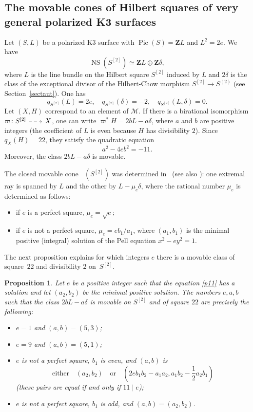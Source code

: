 \documentclass[11pt]{article}
\makeatletter
\newcommand{\Subsection}{\subsection}
\let\mathcal\mathscr
\newcommand{\dradpl}{{\!\!\xymatrix@C=8mm{\ar@{-->}[r]&}\!\!}}
\newcommand{\dratst}{{\,\mathrel{\scalebox{.8}{$\dradpl$}}\,}}
\newcommand{\drascst}{{\,\mathrel{\scalebox{.6}{$\dradpl$}}\,}}
\newcommand{\dra}{\mathchoice{\dradpl}{\dratst}{\drascst}{\drascst}}
\newtheorem{prop}[lemm]{Proposition}
\theoremstyle{definition}
\newcommand\Z{{\mathbf Z}}
\newcommand\cM{\mathcal{M}}
\let\isom\simeq
\let\Ld L
\DeclareMathOperator{\Mov}{\overline{Mov}}
\DeclareMathOperator{\NS}{NS}
\DeclareMathOperator{\Pic}{Pic}
\newcommand\hilbS{S^{[2]}}
\renewcommand{\dratst}{\mathrel{\scalebox{.8}{$\dradpl$}}}
\renewcommand{\drascst}{\mathrel{\scalebox{.6}{$\dradpl$}}}
\makeatother
\begin{document}
\Subsection{The movable cones of Hilbert squares of very general polarized K3 surfaces}\label{sect31}
Let $(S,L)$ be a polarized K3 surface with $\Pic(S)=\Z L$ and $L^2=2e$. We have
\[
\NS(\hilbS)\isom \Z \Ld \oplus \Z \delta,
\]
where $\Ld$ is
the line bundle on the Hilbert square $\hilbS $ induced by $L$ and $2\delta$ is the class of the exceptional divisor of the Hilbert-Chow morphism $\hilbS\to S^{(2)}$ (see Section~\ref{sectaut}). One has
\[
q_{\hilbS}(\Ld)=2e,\quad q_{\hilbS}(\delta)=-2,\quad q_{\hilbS}(\Ld,\delta)=0
.
\]
Let $(X,H)$ correspond to an element of $\cM$. If there is a birational isomorphism $\varpi\colon \hilbS\dra X$, one can write $\varpi^*H=2b\Ld -a\delta$, where $a$ and $b$ are positive integers (the coefficient of $\Ld $ is even because $H$ has divisibility $2$). Since $q_X(H)=22$, they satisfy the quadratic equation
\begin{equation}\label{p11}
a^2-4eb^2=-11.
\end{equation}
Moreover, the class $2b\Ld-a\delta$ is movable.

The closed movable cone $\Mov(\hilbS)$ was determined in~\cite{bama} (see also \cite[Ex.\,5.3]{dm}): one extremal ray is spanned by $\Ld$ and the other by $\Ld-\mu_e\delta$, where the rational number $\mu_e$ is determined as follows:
\begin{itemize}
\item if $e$ is a perfect square, $\mu_e=\sqrt{e}$;
\item if $e$ is not a perfect square, $\mu_e=eb_1/a_1$, where $(a_1,b_1)$ is the minimal positive (integral) solution of the Pell equation $x^2-ey^2=1$.
\end{itemize}

The next proposition explains for which integers $e$ there is a movable class of square~$22$ and divisibility $2$ on~$\hilbS $.

\begin{prop}\label{pr01}
Let $e$ be a positive integer such that the equation \eqref{p11} has a solution and let $(a_2,b_2)$ be the minimal positive solution. The numbers $ e,a,b $
such that the class $2b\Ld-a\delta$ is movable on $\hilbS$ and of square $22$ are precisely the following:
\begin{itemize}
\item $e=1$ and $(a,b)=(5,3)$;
\item $e=9$ and $(a,b)=(5,1)$;
\item $e$ is not a perfect square, $b_1$ is even, and $(a,b)$ is
\[
\text{either}\quad(a_2,b_2)\quad\text{or}\quad (2eb_1b_2-a_1a_2,a_1b_2 -\frac12a_2b_1)
\]
(these pairs are equal if and only if $11\mid e$);
\item $e$ is not a perfect square, $b_1$ is odd, and $(a,b)=(a_2,b_2)$.
\end{itemize}
\end{prop}
\end{document}
